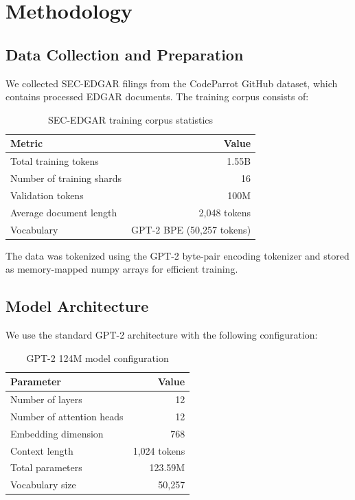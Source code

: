 \documentclass[12pt]{article}
\begin{document}
\section{Methodology}

\subsection{Data Collection and Preparation}

We collected SEC-EDGAR filings from the CodeParrot GitHub dataset, which contains processed EDGAR documents. The training corpus consists of:

\begin{table}[H]
\centering
\begin{tabular}{lr}
\toprule
\textbf{Metric} & \textbf{Value} \\
\midrule
Total training tokens & 1.55B \\
Number of training shards & 16 \\
Validation tokens & 100M \\
Average document length & ~2,048 tokens \\
Vocabulary & GPT-2 BPE (50,257 tokens) \\
\bottomrule
\end{tabular}
\caption{SEC-EDGAR training corpus statistics}
\label{tab:corpus}
\end{table}

The data was tokenized using the GPT-2 byte-pair encoding tokenizer and stored as memory-mapped numpy arrays for efficient training.

\subsection{Model Architecture}

We use the standard GPT-2 architecture with the following configuration:

\begin{table}[H]
\centering
\begin{tabular}{lr}
\toprule
\textbf{Parameter} & \textbf{Value} \\
\midrule
Number of layers & 12 \\
Number of attention heads & 12 \\
Embedding dimension & 768 \\
Context length & 1,024 tokens \\
Total parameters & 123.59M \\
Vocabulary size & 50,257 \\
\bottomrule
\end{tabular}
\caption{GPT-2 124M model configuration}
\label{tab:model}
\end{table}
\end{document}
